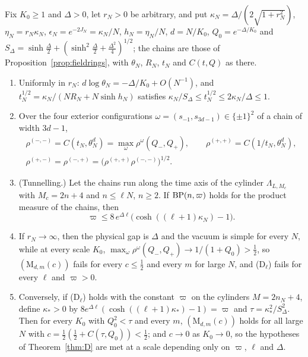 \begin{proposition}
\label{prop:fieldringsall}
Fix $K_0\ge1$ and $\Delta>0$, let $r_N>0$ be arbitrary, and put $\kappa_N=
\Delta/(2\sqrt{1+r_N^2})$, $\eta_N=r_N\kappa_N$, $\epsilon_N=e^{-2J_N}=\kappa_N
/N$, $h_N=\eta_N/N$, $d=N/K_0$, $Q_0=e^{-\Delta/K_0}$ and $S_\Delta=\sinh
\frac\Delta2+(\sinh^2\frac\Delta2+\frac{\Delta^2}4)^{1/2}$; the chains are
those of Proposition~\textup{\ref{prop:fieldrings}}, with $\theta_N$, $R_N$,
$t_N$ and $C(t,Q)$ as there.
\begin{enumerate}[label=\textup{(\roman*)},leftmargin=*]
\item Uniformly in $r_N$: $d\log\theta_N=-\Delta/K_0+O(N^{-1})$, and
$t_N^{1/2}=\kappa_N/(NR_N+N\sinh h_N)$ satisfies $\kappa_N/S_\Delta\le t_N^
{1/2}\le2\kappa_N/\Delta\le1$.
\item Over the four exterior configurations $\omega=(s_{-1},s_{3d-1})\in\{
\pm1\}^2$ of a chain of width $3d-1$,
\begin{gather*}
\rho^{(-,-)}=C(t_N,\theta_N^d)=\max_\omega\rho^\omega(Q_-,Q_+),\qquad
\rho^{(+,+)}=C(1/t_N,\theta_N^d),\\
\rho^{(+,-)}=\rho^{(-,+)}=\bigl(\rho^{(+,+)}\rho^{(-,-)}\bigr)^{1/2}.
\end{gather*}
\item \textup{(Tunnelling.)} Let the chains run along the time axis of the
cylinder $\Lambda_{L,M_c}$ with $M_c=2n+4$ and $n\le\ell N$, $n\ge2$. If
$\mathrm{BP}(n,\varpi)$ holds for the product measure of the chains, then
\[
\varpi\le8\,e^{\Delta\ell}\bigl(\cosh((\ell+1)\kappa_N)-1\bigr).
\]
\item If $r_N\to\infty$, then the physical gap is $\Delta$ and the vacuum is
simple for every $N$, while at every scale $K_0$, $\max_\omega\rho^\omega
(Q_-,Q_+)\to1/(1+Q_0)>\frac12$, so $(\mathrm M_{d,m}(c))$ fails for every
$c\le\frac12$ and every $m$ for large $N$, and \textup{(D$_\ell$)} fails for
every $\ell$ and $\varpi>0$.
\item Conversely, if \textup{(D$_\ell$)} holds with the constant $\varpi$ on
the cylinders $M=2n_N+4$, define $\kappa_*>0$ by $8e^{\Delta\ell}(\cosh((\ell
+1)\kappa_*)-1)=\varpi$ and $\tau=\kappa_*^2/S_\Delta^2$. Then for every $K_0$
with $Q_0^2<\tau$ and every $m$, $(\mathrm M_{d,m}(c))$ holds for all large
$N$ with $c=\frac12(\frac12+C(\tau,Q_0))<\frac12$; and $c\to0$ as $K_0\to0$,
so the hypotheses of Theorem~\ref{thm:D} are met at a scale depending only
on $\varpi$, $\ell$ and $\Delta$.
\end{enumerate}
\end{proposition}

